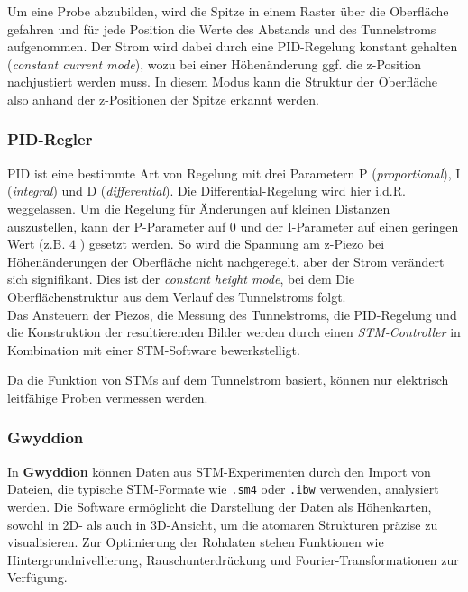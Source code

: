 \documentclass{article}
\begin{document}
Um eine Probe abzubilden, wird die Spitze in einem Raster über die Oberfläche 
gefahren und für jede Position die Werte des Abstands und des Tunnelstroms aufgenommen.
Der Strom wird dabei durch eine PID-Regelung konstant gehalten (\textit{constant current mode}), wozu bei einer Höhenänderung ggf. die z-Position nachjustiert werden muss. In diesem Modus kann die Struktur der Oberfläche also anhand der z-Positionen
der Spitze erkannt werden.

\subsubsection*{PID-Regler}
PID ist eine bestimmte Art von Regelung mit drei Parametern P (\textit{proportional}), I (\textit{integral}) und D (\textit{differential}).
Die Differential-Regelung wird hier i.d.R. weggelassen. Um die Regelung für Änderungen auf kleinen Distanzen auszustellen, kann der P-Parameter auf $0$ und
der I-Parameter auf einen geringen Wert (z.B. $4$ \cite{Anleitung}) gesetzt werden.
So wird die Spannung am z-Piezo bei Höhenänderungen der Oberfläche nicht nachgeregelt,
aber der Strom verändert sich signifikant. Dies ist der \textit{constant height mode},
bei dem Die Oberflächenstruktur aus dem Verlauf des Tunnelstroms folgt.\\

Das Ansteuern der Piezos, die Messung des Tunnelstroms, die PID-Regelung und die Konstruktion der resultierenden Bilder werden
durch einen \textit{STM-Controller} in Kombination mit einer STM-Software bewerkstelligt.

Da die Funktion von STMs auf dem Tunnelstrom basiert, können nur elektrisch leitfähige
Proben vermessen werden. 

\subsubsection*{Gwyddion} 
In \textbf{Gwyddion} können Daten aus STM-Experimenten durch den Import von Dateien, die typische STM-Formate wie \texttt{.sm4} oder \texttt{.ibw} verwenden, analysiert werden. Die Software ermöglicht die Darstellung der Daten als Höhenkarten, sowohl in 2D- als auch in 3D-Ansicht, um die atomaren Strukturen präzise zu visualisieren. Zur Optimierung der Rohdaten stehen Funktionen wie Hintergrundnivellierung, Rauschunterdrückung und Fourier-Transformationen zur Verfügung.
\end{document}
